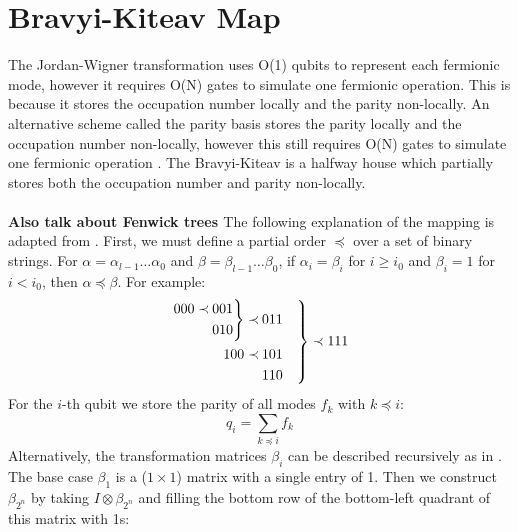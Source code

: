 \documentclass[twoside]{article}
\begin{document}
\section{Bravyi-Kiteav Map}\label{bravyi-kitaev_section}
The Jordan-Wigner transformation uses O(1) qubits to represent each fermionic mode, however it requires O(N) gates to simulate one fermionic operation. This is because it stores the occupation number locally and the parity non-locally. An alternative scheme called the parity basis stores the parity locally and the occupation number non-locally, however this still requires O(N) gates to simulate one fermionic operation \cite{seeley}. The Bravyi-Kiteav is a halfway house which partially stores both the occupation number and parity non-locally.\\\\
\textbf{Also talk about Fenwick trees \cite{operatorLocality}}
The following explanation of the mapping is adapted from \cite{bravyikitaev}. First, we must define a partial order $\preceq$ over a set of binary strings. For $\alpha = \alpha_{l-1}\ldots \alpha_0$ and $\beta = \beta_{l-1}\ldots \beta_0$, if $\alpha_i = \beta_i$ for $i\geq i_0$ and $\beta_i = 1$ for $i < i_0$, then $\alpha \preceq \beta$. For example:
$$
\begin{rcases}
        \begin{aligned}
        \begin{rcases}
                \begin{aligned}
                        000 \prec \>&001 \\
                                  &010
               \end{aligned}
       \end{rcases} \prec \>&011 \\
        100 \prec \>&101\\
                  &110
        \end{aligned}
\end{rcases}
\prec 111
$$
For the $i$-th qubit we store the parity of all modes $f_k$ with $k \preceq i$:
\begin{equation}
        q_i = \sum_{k \preceq i} f_k 
\end{equation}
Alternatively, the transformation matrices $\beta_i$ can be described recursively as in \cite{seeley}. The base case $\beta_1$ is a ($1 \times 1$) matrix with a single entry of 1. Then we construct $\beta_{2^n}$ by taking $I \otimes \beta_{2^n}$ and filling the bottom row of the bottom-left quadrant of this matrix with 1s:
\end{document}
